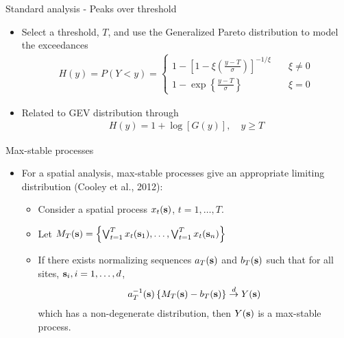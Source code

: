 \documentclass{beamer}
\begin{document}
\begin{frame}{Standard analysis - Peaks over threshold}
  \begin{itemize}  \setlength{\itemsep}{0.5em}
    \item Select a threshold, $T$, and use the Generalized Pareto distribution to model the exceedances
    \begin{align*}
      H(y) = P(Y < y) = \left\{ \begin{array}{ll}
        1 - \left[1 - \xi \left( \frac{ y - T }{ \sigma } \right) \right]^{-1 / \xi} & \quad \xi \neq 0 \\[0.5em]
        1 - \exp \left\{ \frac{ y - T }{ \sigma} \right\} & \quad \xi = 0
      \end{array}\right.
    \end{align*}
    \item Related to GEV distribution through
    \begin{align*}
      H(y) = 1 + \log[G(y)], \quad y \ge T
    \end{align*}
  \end{itemize}
\end{frame}

\begin{frame}{Max-stable processes}
  \begin{itemize} \setlength{\itemsep}{0.5em}
    \item For a spatial analysis, max-stable processes give an appropriate limiting distribution (Cooley et al., 2012):
    \begin{itemize}
      \item Consider a spatial process $x_t(\mbox{\bf s})$, $t = 1, \ldots, T$.
      \item Let $M_T(\mbox{\bf s}) = \left\{ \bigvee_{t=1}^T x_t(\mbox{\bf s}_1), \ldots, \bigvee_{t=1}^T x_t(\mbox{\bf s}_n) \right\}$
      \item If there exists normalizing sequences $a_T(\mbox{\bf s})$ and $b_T(\mbox{\bf s})$ such
      that for all sites, $\mbox{\bf s}_i, i = 1, \ldots, d$,
      \begin{align*}
        a_T^{-1}(\mbox{\bf s}) \left\{ M_T(\mbox{\bf s}) - b_T(\mbox{\bf s}) \right\} \stackrel{d}{\rightarrow} Y(\mbox{\bf s})
      \end{align*}
      which has a non-degenerate distribution, then $Y(\mbox{\bf s})$ is a max-stable process.
    \end{itemize}
  \end{itemize}
\end{frame}
\end{document}
